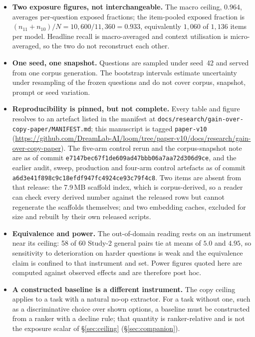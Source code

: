 \documentclass[10pt,twocolumn]{article}
\begin{document}
\begin{itemize}[topsep=2pt,itemsep=2pt,leftmargin=1.4em]
\item \textbf{Two exposure figures, not interchangeable.} The macro ceiling, $0.964$, averages per-question exposed fractions; the item-pooled exposed fraction is $(n_{11}+n_{10})/N=10{,}600/11{,}360=0.933$, equivalently $1{,}060$ of $1{,}136$ items per model. Headline recall is macro-averaged and context utilisation is micro-averaged, so the two do not reconstruct each other.
\item \textbf{One seed, one snapshot.} Questions are sampled under seed~42 and served from one corpus generation. The bootstrap intervals estimate uncertainty under resampling of the frozen questions and do not cover corpus, snapshot, prompt or seed variation.
\item \textbf{Reproducibility is pinned, but not complete.} Every table and figure resolves to an artefact listed in the manifest at \nolinkurl{docs/research/gain-over-copy-paper/MANIFEST.md}; this manuscript is tagged \texttt{paper-v10} (\url{https://github.com/DreamLab-AI/loom/tree/paper-v10/docs/research/gain-over-copy-paper}). The five-arm control rerun and the corpus-snapshot note are as of commit \texttt{e7147bec67f1de609ad47bbb06a7aa72d306d9ce}, and the earlier audit, sweep, production and four-arm control artefacts as of commit \texttt{a6d3e41f898c9c18efdf947fc4924ce93c79f4c8}. Two items are absent from that release: the 7.9\,MB scaffold index, which is corpus-derived, so a reader can check every derived number against the released rows but cannot regenerate the scaffolds themselves; and two embedding caches, excluded for size and rebuilt by their own released scripts.
\item \textbf{Equivalence and power.} The out-of-domain reading rests on an instrument near its ceiling: 58 of 60 Study-2 general pairs tie at means of $5.0$ and $4.95$, so sensitivity to deterioration on harder questions is weak and the equivalence claim is confined to that instrument and set. Power figures quoted here are computed against observed effects and are therefore post hoc.
\item \textbf{A constructed baseline is a different instrument.} The copy ceiling applies to a task with a natural no-op extractor. For a task without one, such as a discriminative choice over shown options, a baseline must be constructed from a ranker with a decline rule; that quantity is ranker-relative and is not the exposure scalar of \S\ref{sec:ceiling} (\S\ref{sec:companion}).
\end{itemize}
\end{document}
